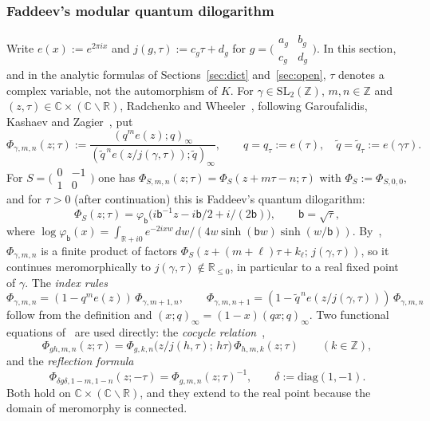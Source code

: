\documentclass[11pt]{amsart}
\numberwithin{equation}{section}
\theoremstyle{plain}
\theoremstyle{definition}
\theoremstyle{remark}
\begin{document}
\subsubsection*{Faddeev's modular quantum dilogarithm}
Write \(e(x):=e^{2\pi ix}\) and \(j(g,\tau):=c_g\tau+d_g\) for \(g=\bigl(\begin{smallmatrix}a_g&b_g\\c_g&d_g\end{smallmatrix}\bigr)\). In this section, and in the analytic formulas of Sections~\ref{sec:dict} and~\ref{sec:open}, \(\tau\) denotes a complex variable, not the automorphism of \(K\). For \(\gamma\in\mathrm{SL}_2(\mathbb Z)\), \(m,n\in\mathbb Z\) and \((z,\tau)\in\mathbb C\times(\mathbb C\smallsetminus\mathbb R)\), Radchenko and Wheeler~\cite[(1)]{RW}, following Garoufalidis, Kashaev and Zagier~\cite{GKZ}, put
\[\Phi_{\gamma,m,n}(z;\tau):=\frac{(q^me(z);q)_\infty}{(\tilde q^{\,n}e(z/j(\gamma,\tau));\tilde q)_\infty},\qquad q=q_\tau:=e(\tau),\quad \tilde q=\tilde q_\tau:=e(\gamma\tau).\]
For \(S=\bigl(\begin{smallmatrix}0&-1\\1&0\end{smallmatrix}\bigr)\) one has \(\Phi_{S,m,n}(z;\tau)=\Phi_S(z+m\tau-n;\tau)\) with \(\Phi_S:=\Phi_{S,0,0}\), and for \(\tau>0\) (after continuation) this is Faddeev's quantum dilogarithm:
\[\Phi_S(z;\tau)=\varphi_{\mathsf b}\bigl(i\mathsf b^{-1}z-i\mathsf b/2+i/(2\mathsf b)\bigr),\qquad \mathsf b=\sqrt\tau,\]
where \(\log\varphi_{\mathsf b}(x)=\int_{\mathbb R+i0}e^{-2ixw}\,dw/(4w\sinh(\mathsf bw)\sinh(w/\mathsf b))\).
By~\cite[Prop.~2(i)]{RW}, \(\Phi_{\gamma,m,n}\) is a finite product of factors \(\Phi_S(z+(m+\ell)\tau+k_\ell;\,j(\gamma,\tau))\), so it continues meromorphically to \(j(\gamma,\tau)\notin\mathbb R_{\le0}\), in particular to a real fixed point of \(\gamma\). The \emph{index rules}
\[\Phi_{\gamma,m,n}=(1-q^me(z))\,\Phi_{\gamma,m+1,n},\qquad \Phi_{\gamma,m,n+1}=(1-\tilde q^{\,n}e(z/j(\gamma,\tau)))\,\Phi_{\gamma,m,n}\]
follow from the definition and \((x;q)_\infty=(1-x)(qx;q)_\infty\). Two functional equations of~\cite{RW} are used directly: the \emph{cocycle relation}~\cite[(17)]{RW},
\[\Phi_{gh,m,n}(z;\tau)=\Phi_{g,k,n}\bigl(z/j(h,\tau);\,h\tau\bigr)\,\Phi_{h,m,k}(z;\tau)\qquad(k\in\mathbb Z),\]
and the \emph{reflection formula}~\cite[\S2.2]{RW}
\[\Phi_{\delta g\delta,1-m,1-n}(z;-\tau)=\Phi_{g,m,n}(z;\tau)^{-1},\qquad \delta:=\mathrm{diag}(1,-1).\]
Both hold on \(\mathbb C\times(\mathbb C\smallsetminus\mathbb R)\), and they extend to the real point because the domain of meromorphy is connected.
\end{document}
